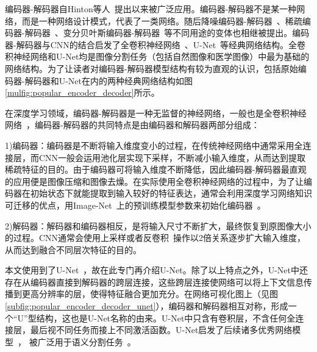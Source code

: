 编码器-解码器自Hinton等人~\cite{hinton2006reducing}提出以来被广泛应用。编码器-解码器不是某一种网络，而是一种网络设计模式，代表了一类网络。随后降噪编码器-解码器~\cite{vincent2008extracting}、稀疏编码器-解码器~\cite{coates2011analysis}、变分贝叶斯编码器-解码器~\cite{kingma2013auto}等不同用途的变体也相继被提出。编码器-解码器与CNN的结合启发了全卷积神经网络~\cite{long2015fully}、U-Net~\cite{ronneberger2015u}等经典网络结构。全卷积神经网络和U-Net均是图像分割任务（包括自然图像和医学图像）中最为基础的网络结构。为了让读者对编码器-解码器模型结构有较为直观的认识，包括原始编码器-解码器和U-Net在内的两种经典网络结构如图\ref{mulfig:popular_encoder_decoder}所示。

在深度学习领域，编码器-解码器是一种无监督的神经网络，一般也是全卷积神经网络~\cite{long2015fully}，编码器-解码器的共同特点是由编码器和解码器两部分组成：

1)编码器：编码器是不断将输入维度变小的过程，在传统神经网络中通常采用全连接层，而CNN一般会运用池化层实现下采样，不断减小输入维度，从而达到提取稀疏特征的目的。由于编码器可将输入维度不断降低，因此编码器-解码器最直观的应用便是图像压缩和图像去燥。在实际使用全卷积神经网络的过程中，为了让编码器在初始状态下就能提取到输入较好的特征表达，通常会利用深度学习网络知识可迁移的优点，用Image-Net~\cite{deng2009imagenet}上的预训练模型参数来初始化编码器~\cite{iglovikov2018ternausnet}。

2)解码器：解码器和编码器相反，是将输入尺寸不断扩大，最终恢复到原图像大小的过程。CNN通常会使用上采样或者反卷积~\cite{zeiler2010deconvolutional}操作以2倍关系逐步扩大输入维度，从而达到融合不同层次特征的目的。

本文使用到了U-Net~\cite{ronneberger2015u}，故在此专门再介绍U-Net。除了以上特点之外，U-Net中还存在从编码器直接到解码器的跨层连接，这些跨层连接使网络可以将上下文信息传播到更高分辨率的层，使得特征融合更加充分。在网络可视化图上（见图\ref{subfig:popular_encoder_decoder_unet}），编码器和解码器相互对称，形成一个“U”型结构，这也是U-Net名称的由来。U-Net中只含有卷积层，不含任何全连接层，最后视不同任务而接上不同激活函数。U-Net启发了后续诸多优秀网络模型~\cite{zhou2018unet++, oktay2018attention, alom2019recurrent}，
被广泛用于语义分割任务~\cite{cciccek20163d,dong2017automatic,li2018h}。
